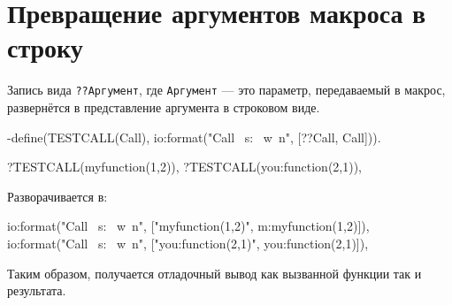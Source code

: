 \section{Превращение аргументов макроса в строку}

Запись вида \texttt{??Аргумент}, где \texttt{Аргумент} --- это параметр, передаваемый в макрос, развернётся в представление аргумента в строковом виде.

\begin{erlang}
-define(TESTCALL(Call), io:format("Call ~s: ~w~n", [??Call, Call])).

?TESTCALL(myfunction(1,2)),
?TESTCALL(you:function(2,1)),
\end{erlang}

Разворачивается в:

\begin{erlang}
io:format("Call ~s: ~w~n", ["myfunction(1,2)", m:myfunction(1,2)]),
io:format("Call ~s: ~w~n", ["you:function(2,1)", you:function(2,1)]),
\end{erlang}

Таким образом, получается отладочный вывод как вызванной функции так и результата.
